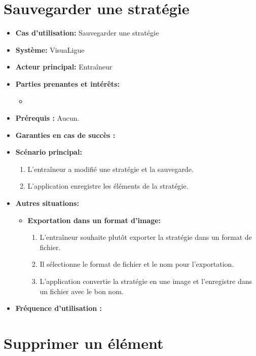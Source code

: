 \section{Sauvegarder une stratégie}
\label{sec:exporter_une_strategie}
\begin{itemize}
    \item \textbf{Cas d'utilisation:} Sauvegarder une strat\'egie
    \item \textbf{Syst\`eme:} VisuaLigue
    \item \textbf{Acteur principal:} Entra\^ineur
    \item \textbf{Parties prenantes et int\'er\^ets:}
    	\begin{itemize}
    		\item
    	\end{itemize}
    \item \textbf{Pr\'erequis :} Aucun.
    \item \textbf{Garanties en cas de succ\`es :}
    \item \textbf{Sc\'enario principal:}
        \begin{enumerate}
            \item L'entra\^ineur a modifié une strat\'egie et la sauvegarde.
            \item L'application enregistre les \'el\'ements de la strat\'egie.
        \end{enumerate}
    \item \textbf{Autres situations:}
        \begin{itemize}
            \item \textbf{Exportation dans un format d'image:}
                \begin{enumerate}
                    \item L'entra\^ineur souhaite plut\^ot exporter la strat\'egie dans un format de fichier.
                    \item Il s\'electionne le format de fichier et le nom pour l'exportation.
                    \item L'application convertie la strat\'egie en une image et l'enregistre dans un fichier avec le bon nom.
                \end{enumerate}
        \end{itemize}
    \item \textbf{Fréquence d'utilisation :}
\end{itemize}



\section{Supprimer un \'el\'ement}
\label{sec:supprimer_un_'el'ement}

